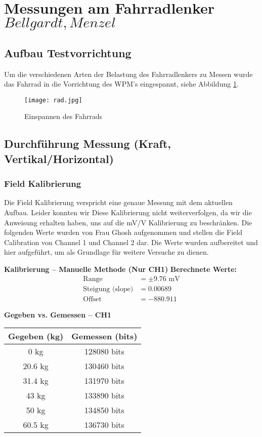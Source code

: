 \section{Messungen am Fahrradlenker \(Bellgardt, Menzel\)}
\subsection{Aufbau Testvorrichtung}
Um die verschiedenen Arten der Belastung des Fahrradlenkers zu Messen wurde das Fahrrad in die Vorrichtung des WPM's eingespannt, siehe Abbildung \ref{fig:rad}.
\begin{figure}[htbp]
    \begin{center}
        \texttt{[image: rad.jpg]}
        \caption[Einspannen des Fahrrads (Abbildungsverzeichnis)]{Einspannen des Fahrrads}
        
        \label{fig:rad}
    \end{center}
\end{figure}

\subsection{Durchf\"uhrung Messung (Kraft, Vertikal/Horizontal)}
\subsubsection{Field Kalibrierung}
Die Field Kalibrierung verspricht eine genaue Messung mit dem aktuellen Aufbau. Leider konnten wir Diese Kalibrierung nicht weiterverfolgen, da wir die Anweisung erhalten haben, uns auf die mV/V Kalibrierung zu beschränken. 
Die folgenden Werte wurden von Frau Ghosh aufgenommen und stellen die Field Calibration von Channel 1 und Channel 2 dar. Die Werte wurden aufbereitet und hier aufgeführt, um als Grundlage für weitere Versuche zu dienen. 

\textbf{Kalibrierung – Manuelle Methode (Nur CH1)}
\textbf{Berechnete Werte:}
\begin{align*}
\text{Range} &= \pm 9.76 \text{ mV} \\
\text{Steigung (slope)} &= 0.00689 \\
\text{Offset} &= -880.911
\end{align*}

\clearpage
\textbf{Gegeben vs. Gemessen – CH1}
\begin{center}
\begin{tabular}{|c|c|}
\hline
\textbf{Gegeben (kg)} & \textbf{Gemessen (bits)} \\
\hline
0 kg & 128080 bits \\
20.6 kg & 130460 bits \\
31.4 kg & 131970 bits \\
43 kg & 133890 bits \\
50 kg & 134850 bits \\
60.5 kg & 136730 bits \\
\hline
\end{tabular}
\end{center}

